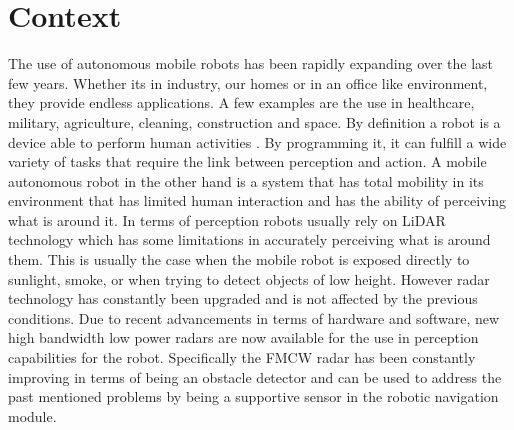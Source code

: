 \section{Context}
The use of autonomous mobile robots has been rapidly expanding over the last few years. Whether its in industry, our homes or in an office like environment, they provide endless applications. A few examples are the use in healthcare, military, agriculture, cleaning, construction and space.
By definition a robot is a device able to perform human activities \cite{robo}.  By programming it, it can fulfill a wide variety of tasks that require the link between perception and  action. A mobile autonomous robot in the other hand is a system that has total mobility in its environment that has limited human interaction and has the ability of perceiving what is around it. In terms of perception robots usually rely on \ac{LiDAR} technology which has some limitations in accurately perceiving what is around them. This is usually the case when the mobile robot is exposed directly to sunlight, smoke, or when trying to detect objects of low height. However \ac{radar} technology has constantly  been  upgraded and is not affected by the previous conditions. Due to recent advancements in terms of hardware and software, new high bandwidth low power radars are now available for the use in perception capabilities for the robot.   
Specifically the \ac{FMCW} \ac{radar} has been constantly improving in terms of being an obstacle detector and  can be used to address the past mentioned problems by being a supportive sensor in the robotic navigation module.




